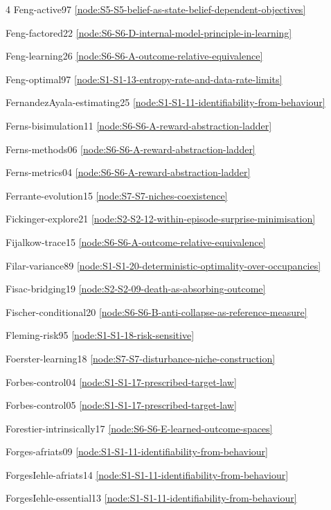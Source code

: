\documentclass[10pt]{article}
\begin{document}
{\begin{multicols}{4}
Feng-active97 \hfill \ref{node:S5-S5-belief-as-state-belief-dependent-objectives}\par
Feng-factored22 \hfill \ref{node:S6-S6-D-internal-model-principle-in-learning}\par
Feng-learning26 \hfill \ref{node:S6-S6-A-outcome-relative-equivalence}\par
Feng-optimal97 \hfill \ref{node:S1-S1-13-entropy-rate-and-data-rate-limits}\par
FernandezAyala-estimating25 \hfill \ref{node:S1-S1-11-identifiability-from-behaviour}\par
Ferns-bisimulation11 \hfill \ref{node:S6-S6-A-reward-abstraction-ladder}\par
Ferns-methods06 \hfill \ref{node:S6-S6-A-reward-abstraction-ladder}\par
Ferns-metrics04 \hfill \ref{node:S6-S6-A-reward-abstraction-ladder}\par
Ferrante-evolution15 \hfill \ref{node:S7-S7-niches-coexistence}\par
Fickinger-explore21 \hfill \ref{node:S2-S2-12-within-episode-surprise-minimisation}\par
Fijalkow-trace15 \hfill \ref{node:S6-S6-A-outcome-relative-equivalence}\par
Filar-variance89 \hfill \ref{node:S1-S1-20-deterministic-optimality-over-occupancies}\par
Fisac-bridging19 \hfill \ref{node:S2-S2-09-death-as-absorbing-outcome}\par
Fischer-conditional20 \hfill \ref{node:S6-S6-B-anti-collapse-as-reference-measure}\par
Fleming-risk95 \hfill \ref{node:S1-S1-18-risk-sensitive}\par
Foerster-learning18 \hfill \ref{node:S7-S7-disturbance-niche-construction}\par
Forbes-control04 \hfill \ref{node:S1-S1-17-prescribed-target-law}\par
Forbes-control05 \hfill \ref{node:S1-S1-17-prescribed-target-law}\par
Forestier-intrinsically17 \hfill \ref{node:S6-S6-E-learned-outcome-spaces}\par
Forges-afriats09 \hfill \ref{node:S1-S1-11-identifiability-from-behaviour}\par
ForgesIehle-afriats14 \hfill \ref{node:S1-S1-11-identifiability-from-behaviour}\par
ForgesIehle-essential13 \hfill \ref{node:S1-S1-11-identifiability-from-behaviour}\par

\end{multicols}}
\end{document}
